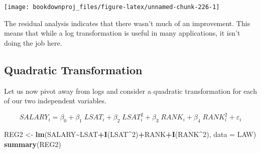 \documentclass[
]{book}
\newenvironment{Shaded}{\begin{snugshade}}{\end{snugshade}}
\newcommand{\AttributeTok}[1]{\textcolor[rgb]{0.13,0.29,0.53}{#1}}
\newcommand{\DecValTok}[1]{\textcolor[rgb]{0.00,0.00,0.81}{#1}}
\newcommand{\FunctionTok}[1]{\textcolor[rgb]{0.13,0.29,0.53}{\textbf{#1}}}
\newcommand{\NormalTok}[1]{#1}
\newcommand{\OtherTok}[1]{\textcolor[rgb]{0.56,0.35,0.01}{#1}}
\newcommand{\SpecialCharTok}[1]{\textcolor[rgb]{0.81,0.36,0.00}{\textbf{#1}}}
\begin{document}
\begin{center}\texttt{[image: bookdownproj\_files/figure-latex/unnamed-chunk-226-1]} \end{center}

The residual analysis indicates that there wasn't much of an improvement. This means that while a log transformation is useful in many applications, it isn't doing the job here.

\subsection*{Quadratic Transformation}\label{quadratic-transformation}

Let us now pivot away from logs and consider a quadratic transformation for each of our two independent variables.

\[SALARY_i = \beta_0 + \beta_1 \; LSAT_i + \beta_2 \; LSAT_i^2 + \beta_3 \; RANK_i + \beta_4 \; RANK_i^2 + \varepsilon_i\]

\begin{Shaded}
\begin{Highlighting}[]
\NormalTok{REG2 }\OtherTok{\textless{}{-}} \FunctionTok{lm}\NormalTok{(SALARY}\SpecialCharTok{\textasciitilde{}}\NormalTok{LSAT}\SpecialCharTok{+}\FunctionTok{I}\NormalTok{(LSAT}\SpecialCharTok{\^{}}\DecValTok{2}\NormalTok{)}\SpecialCharTok{+}\NormalTok{RANK}\SpecialCharTok{+}\FunctionTok{I}\NormalTok{(RANK}\SpecialCharTok{\^{}}\DecValTok{2}\NormalTok{),}
           \AttributeTok{data =}\NormalTok{ LAW)}
\FunctionTok{summary}\NormalTok{(REG2)}
\end{Highlighting}
\end{Shaded}
\end{document}
